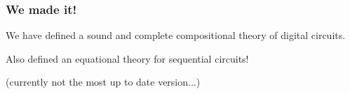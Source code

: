 \begin{frame}
    \frametitle{We made it!}

    We have defined a \alert{sound and complete} compositional
    theory of digital circuits.

    \wait

    Also defined an \alert{equational theory} for sequential circuits!

    \wait

    \nocite{circuits}

    \printbibliography[heading=none]
    \scriptsize
    (currently not the most up to date version...)

\end{frame}